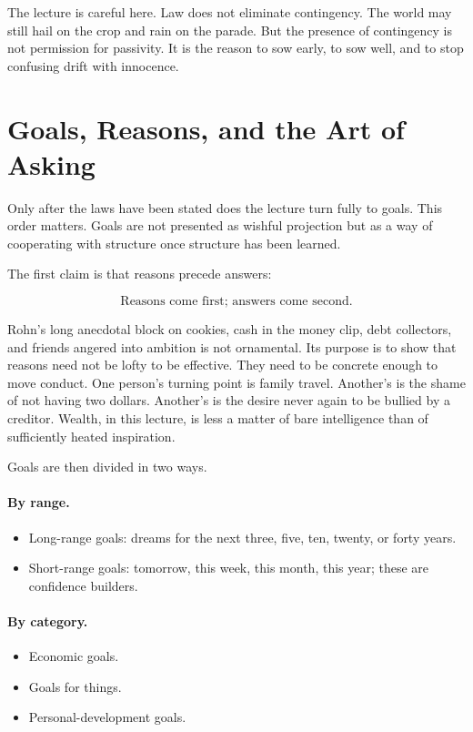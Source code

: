 The lecture is careful here. Law does not eliminate contingency. The world may still hail on the crop and rain on the parade. But the presence of contingency is not permission for passivity. It is the reason to sow early, to sow well, and to stop confusing drift with innocence.

\section{Goals, Reasons, and the Art of Asking}

Only after the laws have been stated does the lecture turn fully to goals. This order matters. Goals are not presented as wishful projection but as a way of cooperating with structure once structure has been learned.

The first claim is that reasons precede answers:

\begin{equation}
\text{Reasons come first; answers come second.}
\end{equation}

Rohn's long anecdotal block on cookies, cash in the money clip, debt collectors, and friends angered into ambition is not ornamental. Its purpose is to show that reasons need not be lofty to be effective. They need to be concrete enough to move conduct. One person's turning point is family travel. Another's is the shame of not having two dollars. Another's is the desire never again to be bullied by a creditor. Wealth, in this lecture, is less a matter of bare intelligence than of sufficiently heated inspiration.

Goals are then divided in two ways.

\paragraph{By range.}
\begin{itemize}
\item Long-range goals: dreams for the next three, five, ten, twenty, or forty years.
\item Short-range goals: tomorrow, this week, this month, this year; these are confidence builders.
\end{itemize}

\paragraph{By category.}
\begin{itemize}
\item Economic goals.
\item Goals for things.
\item Personal-development goals.
\end{itemize}

